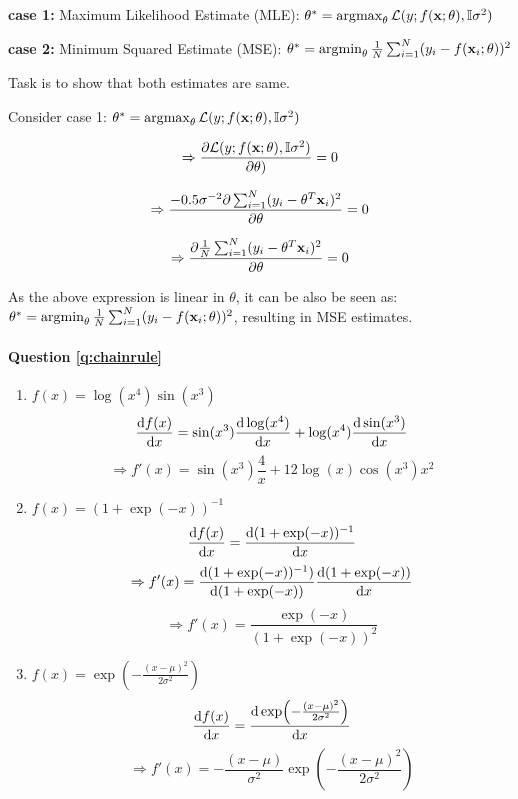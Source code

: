 \textbf{case 1:} Maximum Likelihood Estimate (MLE): 
$\theta^* = \operatorname*{\arg\!\max}_{\theta} \mathcal{L}(y; f(\mathbf{x}; \theta), \mathbb{I}\sigma^2)$

\textbf{case 2:} Minimum Squared Estimate (MSE):
$\theta^* = \operatorname*{\arg\!\min}_{\theta} \frac{1}{N}\sum_{i=1}^N(y_i - f(\mathbf{x}_i; \theta))^2$

Task is to show that both estimates are same.



Consider case 1: $\theta^* = \operatorname*{\arg\!\max}_{\theta} \mathcal{L}(y; f(\mathbf{x}; \theta), \mathbb{I}\sigma^2)$

$$ \Rightarrow \frac{\partial \mathcal{L}(y; f(\mathbf{x}; \theta), \mathbb{I}\sigma^2)}{\partial \theta)} = 0 $$


$$ \Rightarrow \frac{-0.5\sigma^{-2}\partial \sum_{i=1}^N (y_i - \theta^T\mathbf{x}_i)^2}{\partial \theta} = 0 $$

$$ \Rightarrow \frac{\partial \frac{1}{N}\sum_{i=1}^N (y_i - \theta^T\mathbf{x}_i)^2}{\partial \theta} = 0 $$

As the above expression is linear in $\theta$, it can be also be seen as: $\theta^* = \operatorname*{\arg\!\min}_{\theta} \frac{1}{N}\sum_{i=1}^N(y_i - f(\mathbf{x}_i; \theta))^2$, resulting in MSE estimates.




\paragraph{Question \ref{q:chainrule}}
\begin{enumerate}[label=\alph*.]
\item $f(x) = \log (x^4) \sin (x^3)$
        $$\frac{\mathrm{d} f(x)}{\mathrm{d} x} = \sin(x^3) \frac{\mathrm{d} \log(x^4)}{\mathrm{d} x} + \log (x^4)\frac{\mathrm{d} \sin(x^3)}{\mathrm{d} x}$$
        $$\Rightarrow f'(x) = \sin(x^3)\frac{4}{x} + 12\log(x)\cos(x^3)x^2$$
        
\item $f(x) = (1 + \exp(-x))^{-1}$
         $$\frac{\mathrm{d} f(x)}{\mathrm{d} x} = \frac{\mathrm{d} (1 + \exp(-x))^{-1}}{\mathrm{d} x}$$
         $$\Rightarrow f'(x) = \frac{\mathrm{d} (1 + \exp(-x))^{-1})}{\mathrm{d}(1 + \exp(-x))} \frac{\mathrm{d}(1 + \exp(-x))}{\mathrm{d} x}$$
         $$\Rightarrow f'(x) = \frac{\exp(-x)}{(1 + \exp(-x))^2}$$
        
\item $f(x) = \exp\left(-\frac{(x-\mu)^2}{2\sigma^2}\right)$
         $$\frac{\calcd f(x)}{\calcd x} = \frac{\calcd \exp\left(-\frac{(x-\mu)^2}{2\sigma^2}\right)}{\calcd x}$$
         $$\Rightarrow f'(x) = -\frac{(x-\mu)}{\sigma^2}\exp\left(-\frac{(x-\mu)^2}{2\sigma^2}\right)$$

\end{enumerate}
